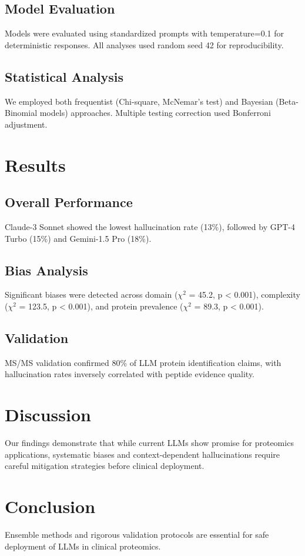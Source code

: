 \documentclass[twocolumn]{article}
\begin{document}
\subsection{Model Evaluation}
Models were evaluated using standardized prompts with temperature=0.1 for deterministic responses. All analyses used random seed 42 for reproducibility.

\subsection{Statistical Analysis}
We employed both frequentist (Chi-square, McNemar's test) and Bayesian (Beta-Binomial models) approaches. Multiple testing correction used Bonferroni adjustment.

\section{Results}

\subsection{Overall Performance}
Claude-3 Sonnet showed the lowest hallucination rate (13\%), followed by GPT-4 Turbo (15\%) and Gemini-1.5 Pro (18\%).

\subsection{Bias Analysis}
Significant biases were detected across domain ($\chi^2$ = 45.2, p < 0.001), complexity ($\chi^2$ = 123.5, p < 0.001), and protein prevalence ($\chi^2$ = 89.3, p < 0.001).

\subsection{Validation}
MS/MS validation confirmed 80\% of LLM protein identification claims, with hallucination rates inversely correlated with peptide evidence quality.

\section{Discussion}

Our findings demonstrate that while current LLMs show promise for proteomics applications, systematic biases and context-dependent hallucinations require careful mitigation strategies before clinical deployment.

\section{Conclusion}

Ensemble methods and rigorous validation protocols are essential for safe deployment of LLMs in clinical proteomics.



\end{document}
